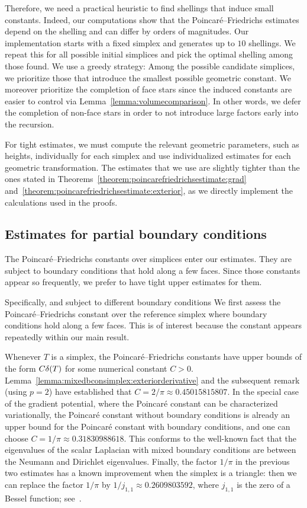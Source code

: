 \documentclass[10pt,a4paper]{article}
\begin{document}
Therefore, we need a practical heuristic to find shellings that induce small constants. Indeed, our computations show that the Poincar\'e--Friedrichs estimates depend on the shelling and can differ by orders of magnitudes. Our implementation starts with a fixed simplex and generates up to $10$ shellings. 
We repeat this for all possible initial simplices and pick the optimal shelling among those found.
We use a greedy strategy: Among the possible candidate simplices, we prioritize those that introduce the smallest possible geometric constant. 
We moreover prioritize the completion of face stars since the induced constants are easier to control via Lemma~\ref{lemma:volumecomparison}. 
In other words, we defer the completion of non-face stars in order to not introduce large factors early into the recursion. 

For tight estimates, we must compute the relevant geometric parameters, such as heights, individually for each simplex and use individualized estimates for each geometric transformation. The estimates that we use are slightly tighter than the ones stated in Theorems~\ref{theorem:poincarefriedrichsestimate:grad} and~\ref{theorem:poincarefriedrichsestimate:exterior},
as we directly implement the calculations used in the proofs.







\subsection{Estimates for partial boundary conditions}

The Poincar\'e--Friedrichs constants over simplices enter our estimates.
They are subject to boundary conditions that hold along a few faces. 
Since those constants appear so frequently, we prefer to have tight upper estimates for them. 

Specifically, and subject to different boundary conditions 
We first assess the Poincar\'e--Friedrichs constant over the reference simplex where boundary conditions hold along a few faces. 
This is of interest because the constant appears repeatedly within our main result. 

Whenever $T$ is a simplex, the Poincar\'e--Friedrichs constants have upper bounds of the form $C {\delta}(T)$ for some numerical constant $C > 0$.
Lemma~\ref{lemma:mixedbconsimplex:exteriorderivative} and the subsequent remark (using $p=2$) have established that $C = 2/\pi \approx 0.45015815807$. In the special case of the gradient potential, where the Poincar\'e constant can be characterized variationally, the Poincar\'e constant without boundary conditions is already an upper bound for the Poincar\'e constant with boundary conditions, and one can choose $C = 1/\pi \approx 0.31830988618$.
This conforms to the well-known fact that the eigenvalues of the scalar Laplacian with mixed boundary conditions are between the Neumann and Dirichlet eigenvalues.
Finally, the factor $1/\pi$ in the previous two estimates has a known improvement when the simplex is a triangle:
then we can replace the factor $1/\pi$ by $1/j_{1,1} \approx 0.2609803592$, where $j_{1,1}$ is the zero of a Bessel function; see~\cite{laugesen2010minimizing}.
\end{document}
